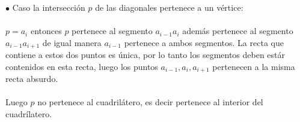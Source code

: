 \documentclass[a4paper]{article}
\begin{document}
$\bullet$ Caso la intersección $p$ de las diagonales pertenece a un vértice:\\\\

$p=a_{i}$ entonces $p$ pertenece al segmento $a_{i-1}a_{i}$ además pertenece
al segmento $a_{i-1}a_{i+1}$ de igual manera $a_{i-1}$ pertenece a ambos segmentos.
La recta que contiene a estos dos puntos es única, por lo tanto
los segmentos deben estár contenidos en esta recta, luego los puntos
$a_{i-1}, a_{i}, a_{i+1}$ pertenecen a la misma recta absurdo.\\\\

Luego $p$ no pertenece al cuadrilátero, es decir pertenece al interior del cuadrílatero.
\end{document}
